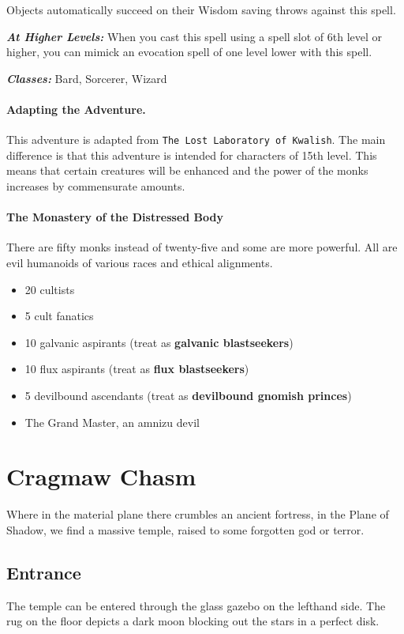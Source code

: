 Objects automatically succeed on their Wisdom saving throws against this spell.

\textbf{\textit{At Higher Levels:}} When you cast this spell using a spell slot of
6th level or higher, you can mimick an evocation spell of one level lower with this
spell.

\textbf{\textit{Classes:}} Bard, Sorcerer, Wizard

\paragraph{Adapting the Adventure.}
This adventure is adapted from \texttt{The Lost Laboratory of Kwalish}. The main
difference is that this adventure is intended for characters of 15th level. This
means that certain creatures will be enhanced and the power of the monks increases
by commensurate amounts.

\paragraph{The Monastery of the Distressed Body}
There are fifty monks instead of twenty-five and some are more powerful. All are
evil humanoids of various races and ethical alignments.

\begin{itemize}
  \item 20 cultists
  \item 5 cult fanatics
  \item 10 galvanic aspirants (treat as \textbf{galvanic blastseekers})
  \item 10 flux aspirants (treat as \textbf{flux blastseekers})
  \item 5 devilbound ascendants (treat as \textbf{devilbound gnomish princes})
  \item The Grand Master, an amnizu devil
\end{itemize}

\section{Cragmaw Chasm}

Where in the material plane there crumbles an ancient fortress, in the Plane
of Shadow, we find a massive temple, raised to some forgotten god or terror.

\subsection{Entrance}
The temple can be entered through the glass gazebo on the lefthand side. The rug on the floor depicts a dark moon blocking out the stars in a perfect disk.

